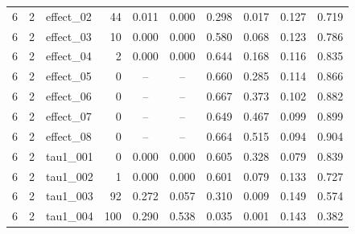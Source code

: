 {\begin{longtable}{cc l r cc cc cc}
6 & 2 & effect\_02 & 44 & 0.011 & 0.000 & 0.298 & 0.017 & 0.127 & 0.719\\
6 & 2 & effect\_03 & 10 & 0.000 & 0.000 & 0.580 & 0.068 & 0.123 & 0.786\\
6 & 2 & effect\_04 & 2 & 0.000 & 0.000 & 0.644 & 0.168 & 0.116 & 0.835\\
6 & 2 & effect\_05 & 0 & -- & -- & 0.660 & 0.285 & 0.114 & 0.866\\
6 & 2 & effect\_06 & 0 & -- & -- & 0.667 & 0.373 & 0.102 & 0.882\\
6 & 2 & effect\_07 & 0 & -- & -- & 0.649 & 0.467 & 0.099 & 0.899\\
6 & 2 & effect\_08 & 0 & -- & -- & 0.664 & 0.515 & 0.094 & 0.904\\
6 & 2 & tau1\_001 & 0 & 0.000 & 0.000 & 0.605 & 0.328 & 0.079 & 0.839\\
6 & 2 & tau1\_002 & 1 & 0.000 & 0.000 & 0.601 & 0.079 & 0.133 & 0.727\\
6 & 2 & tau1\_003 & 92 & 0.272 & 0.057 & 0.310 & 0.009 & 0.149 & 0.574\\
6 & 2 & tau1\_004 & 100 & 0.290 & 0.538 & 0.035 & 0.001 & 0.143 & 0.382\\
\end{longtable}}
